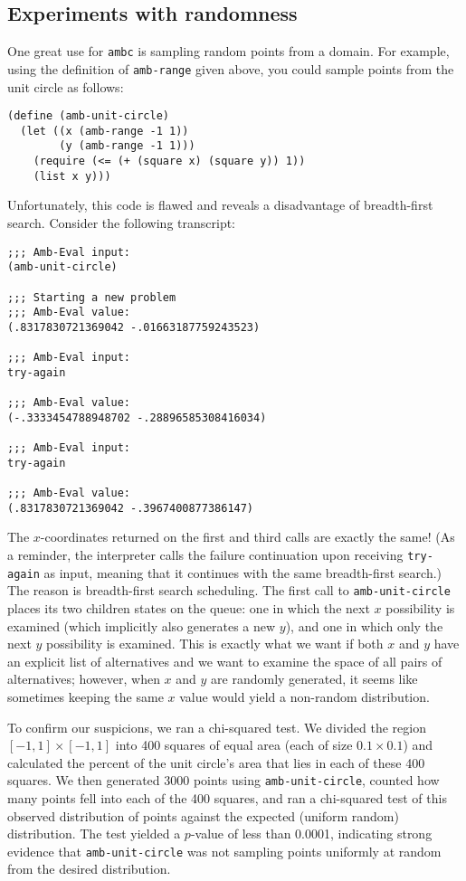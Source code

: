 \documentclass{article}
\begin{document}
\subsection{Experiments with randomness}

One great use for \texttt{ambc} is sampling random points from a domain. For
example, using the definition of \texttt{amb-range} given above, you could
sample points from the unit circle as follows:
\begin{lstlisting}
(define (amb-unit-circle)
  (let ((x (amb-range -1 1))
        (y (amb-range -1 1)))
    (require (<= (+ (square x) (square y)) 1))
    (list x y)))
\end{lstlisting}

Unfortunately, this code is flawed and reveals a disadvantage of
breadth-first search. Consider the following transcript:
\begin{lstlisting}
;;; Amb-Eval input:
(amb-unit-circle)

;;; Starting a new problem
;;; Amb-Eval value:
(.8317830721369042 -.01663187759243523)

;;; Amb-Eval input:
try-again

;;; Amb-Eval value:
(-.3333454788948702 -.28896585308416034)

;;; Amb-Eval input:
try-again

;;; Amb-Eval value:
(.8317830721369042 -.3967400877386147)
\end{lstlisting}

The $x$-coordinates returned on the first and third calls are exactly
the same!  (As a reminder, the interpreter calls the failure
continuation upon receiving \texttt{try-again} as input, meaning that
it continues with the same breadth-first search.) The reason is
breadth-first search scheduling. The first call to
\texttt{amb-unit-circle} places its two children states on the queue:
one in which the next $x$ possibility is examined (which implicitly
also generates a new $y$), and one in which only the next $y$
possibility is examined. This is exactly what we want if both $x$ and
$y$ have an explicit list of alternatives and we want to examine the
space of all pairs of alternatives; however, when $x$ and $y$ are
randomly generated, it seems like sometimes keeping the same $x$ value
would yield a non-random distribution.

To confirm our suspicions, we ran a chi-squared test. We divided the
region $[-1,1]\times[-1,1]$ into 400 squares of equal area (each of
size $0.1\times 0.1$) and calculated the percent of the unit circle's
area that lies in each of these 400 squares. We then generated 3000
points using \texttt{amb-unit-circle}, counted how many points fell
into each of the 400 squares, and ran a chi-squared test of this
observed distribution of points against the expected (uniform random)
distribution. The test yielded a $p$-value of less than 0.0001,
indicating strong evidence that \texttt{amb-unit-circle} was not
sampling points uniformly at random from the desired distribution.
\end{document}
